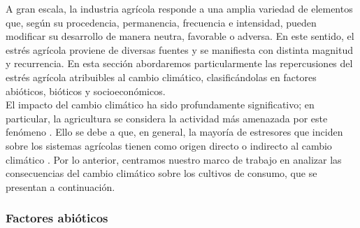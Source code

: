 A gran escala, la industria agrícola responde a una amplia variedad de elementos que, según su procedencia, permanencia, frecuencia e intensidad, pueden modificar su desarrollo de manera neutra, favorable o adversa. En este sentido, el estrés agrícola proviene de diversas fuentes y se manifiesta con distinta magnitud y recurrencia. En esta sección abordaremos particularmente las repercusiones del estrés agrícola atribuibles al cambio climático, clasificándolas en factores abióticos, bióticos y socioeconómicos.\\

El impacto del cambio climático ha sido profundamente significativo; en particular, la agricultura se considera la actividad más amenazada por este fenómeno \cite{Boyer_1982, Raza_2019}. Ello se debe a que, en general, la mayoría de estresores que inciden sobre los sistemas agrícolas tienen como origen directo o indirecto al cambio climático \cite{Olschewski_2024, Raza_2019, Surowka_2020}. Por lo anterior, centramos nuestro marco de trabajo en analizar las consecuencias del cambio climático sobre los cultivos de consumo, que se presentan a continuación.

\subsubsection{Factores abióticos\\}

